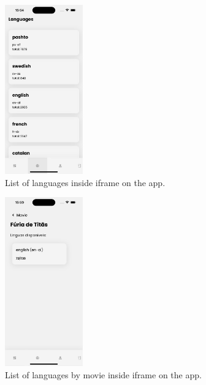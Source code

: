 \documentclass[12pt]{article}
\begin{document}
  \begin{figure}[!h]
    \centering
    \caption{
     List of languages inside iframe on the app.
    }
    \label{fig:app3}
    \includegraphics[width=0.3\textwidth]{assets/16.png}
  \end{figure}


  \begin{figure}[!h]
    \centering
    \caption{
     List of languages by movie inside iframe on the app.
    }
    \label{fig:app4}
    \includegraphics[width=0.3\textwidth]{assets/17.png}
  \end{figure}
\end{document}

